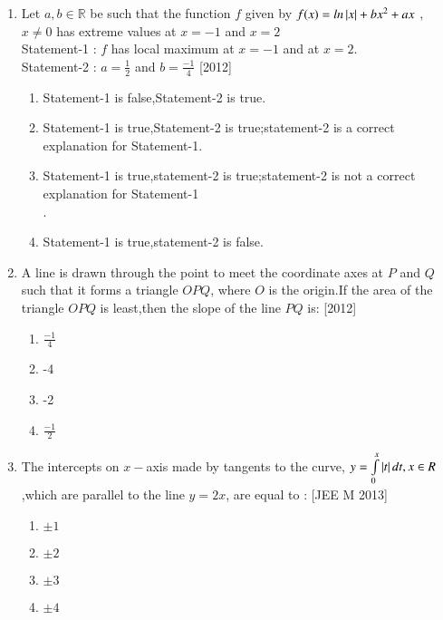 \documentclass[journal,12pt,twocolumn]{IEEEtran}
\theoremstyle{remark}
\begin{document}
\begin{enumerate}
\item Let $a,b\in \mathbb R$ be such that the function $f$ given by $f(x)=ln\left\vert x\right\vert+bx^{2}+ax$ , $x \neq 0$ has extreme values at $x=-1$ and $x=2$\\
Statement-1 : $f$ has local maximum at $x=-1$ and at $x=2$.\\
Statement-2 : $a=\frac{1}{2}$ and $b=\frac{-1}{4}$ \hfill{[2012]}\\
\begin{enumerate}
    \item Statement-1 is false,Statement-2 is true.\\
    \item Statement-1 is true,Statement-2 is true;statement-2 is a correct explanation for Statement-1.\\
    \item Statement-1 is true,statement-2 is true;statement-2 is not a correct explanation for Statement-1\\.
    \item Statement-1 is true,statement-2 is false.\\
\end{enumerate}

\item A line is drawn through the point to meet the coordinate axes at $P$ and $Q$ such that it forms a triangle $OPQ$, where $O$ is the origin.If the area of the triangle $OPQ$ is least,then the slope of the line $PQ$ is: \hfill{[2012]}\\
\begin{enumerate}
    \item  $\frac{-1}{4}$\\
    \item  -4\\
    \item  -2\\
    \item  $\frac{-1}{2}$\\
\end{enumerate}
\item The intercepts on $x-$axis made by tangents to the curve, $y=\int\limits_0^x\left\vert t\right\vert dt,x\in R$,which are parallel to the line $y=2x$, are equal to : {[JEE M 2013]}\\
\begin{enumerate}
    \item  $\pm1$\\
    \item  $\pm2$\\
    \item  $\pm3$\\
    \item  $\pm4$\\
    

\end{enumerate}
\end{enumerate}
\end{document}

